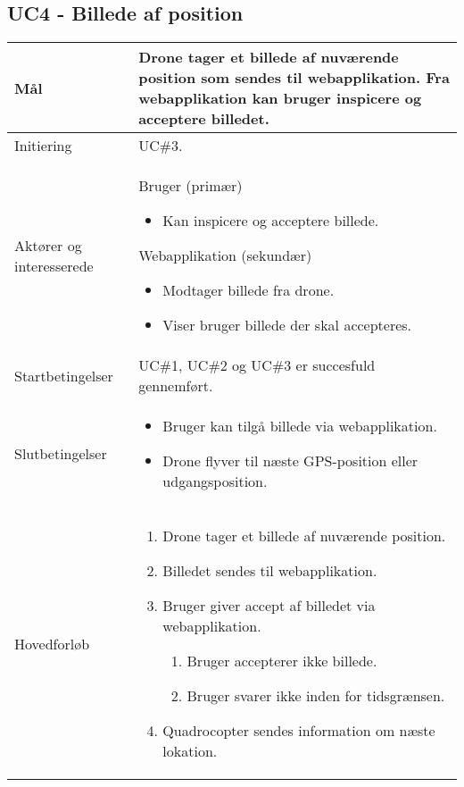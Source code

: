 \subsection*{UC4 - Billede af position}

\begin{table}[H]
\begin{tabular}{| p{3cm}| p{11.5cm}|}
\hline

Mål	 							& Drone tager et billede af nuværende position som sendes til webapplikation. Fra webapplikation kan bruger inspicere og acceptere billedet. \\\hline
Initiering 							& UC\#3. \\\hline
Aktører og interesserede			& Bruger (primær) 
										\begin{itemize}
											\item Kan inspicere og acceptere billede.
										\end{itemize} 
									  Webapplikation (sekundær)
										\begin{itemize}
											\item Modtager billede fra drone.
											\item Viser bruger billede der skal accepteres.
										\end{itemize} \\\hline
Startbetingelser							& UC\#1, UC\#2 og UC\#3 er succesfuld gennemført. \\\hline
Slutbetingelser						& 	\begin{itemize}
											\item Bruger kan tilgå billede via webapplikation.
											\item Drone flyver til næste GPS-position eller udgangsposition.
										\end{itemize} \\\hline
Hovedforløb				&
 
									\renewcommand{\labelenumi}{\arabic{enumi}.}
									\renewcommand{\labelenumii}{\Roman{enumii}:}

									\begin{enumerate}[topsep=0.0cm, leftmargin=0.5cm]
										\item Drone tager et billede af nuværende position.
										\item Billedet sendes til webapplikation.
										\item Bruger giver accept af billedet via webapplikation.
											\begin{enumerate}[partopsep=4cm, topsep=0cm, leftmargin=1cm]
												\item Bruger accepterer ikke billede.
												\item Bruger svarer ikke inden for tidsgrænsen.
											\end{enumerate}
										\item Quadrocopter sendes information om næste lokation.
									\end{enumerate} \\\hline	


\end{tabular}
\end{table}

